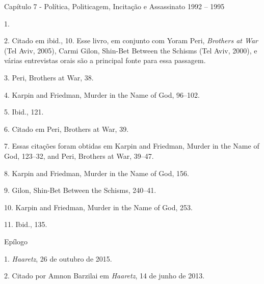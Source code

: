 

Capítulo 7 - Política, Politicagem, Incitação e Assassinato 1992 -- 1995

1. 

2. Citado em ibid., 10. Esse livro, em conjunto com Yoram Peri, \emph{Brothers
at War} (Tel Aviv, 2005), Carmi Gilon, Shin-Bet Between the Schisms (Tel
Aviv, 2000), e várias entrevistas orais são a principal fonte para essa
passagem.

3. Peri, Brothers at War, 38.

4. Karpin and Friedman, Murder in the Name of God, 96--102.

5. Ibid., 121.

6. Citado em Peri, Brothers at War, 39.

7. Essas citações foram obtidas em Karpin and Friedman, Murder in the
Name of God, 123--32, and Peri, Brothers at War, 39--47.

8. Karpin and Friedman, Murder in the Name of God, 156.

9. Gilon, Shin-Bet Between the Schisms, 240--41.

10. Karpin and Friedman, Murder in the Name of God, 253.

11. Ibid., 135.

Epílogo

1. \emph{Haaretz}, 26 de outubro de 2015.

2. Citado por Amnon Barzilai em \emph{Haaretz}, 14 de junho de 2013.


